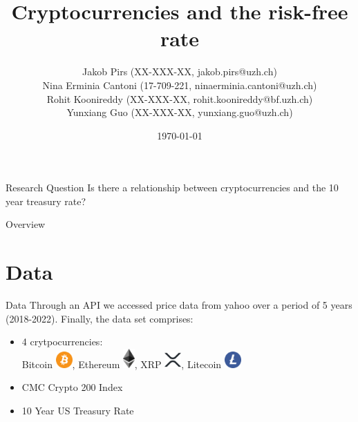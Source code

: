 \documentclass[11pt]{beamer}
\author{\small Jakob Pirs (XX-XXX-XX, jakob.pirs@uzh.ch)\\
Nina Erminia Cantoni (17-709-221, ninaerminia.cantoni@uzh.ch)\\
Rohit Koonireddy (XX-XXX-XX, rohit.koonireddy@bf.uzh.ch)\\
Yunxiang Guo (XX-XXX-XX, yunxiang.guo@uzh.ch)\\}
\title{Cryptocurrencies and the risk-free rate}
\institute[]{University of Zurich, Department of Banking and Finance}
\date{\today}
\begin{document}
\begin{frame}
\titlepage
\end{frame}


\begin{frame}{Research Question}
 \centering Is there a relationship between cryptocurrencies and the 10 year treasury rate?
\end{frame}

\begin{frame}{Overview}
\tableofcontents 
\end{frame}


\section{Data}
\begin{frame}{Data}
Through an API we accessed price data from yahoo over a period of 5 years (2018-2022). Finally, the data set comprises:
 \begin{itemize}
        \item 4 crytpocurrencies: \\
        Bitcoin \includegraphics[width=0.05\textwidth]{Bitcoin.png}, Ethereum \includegraphics[width=0.035\textwidth]{ETH.png}, XRP \includegraphics[width=0.05\textwidth]{XRP.png}, Litecoin \includegraphics[width=0.05\textwidth]{LTC.png}
        
        \medskip
        
        \item CMC Crypto 200 Index
        
        \medskip
        
        \item 10 Year US Treasury Rate
    \end{itemize}

\end{frame}
\end{document}
